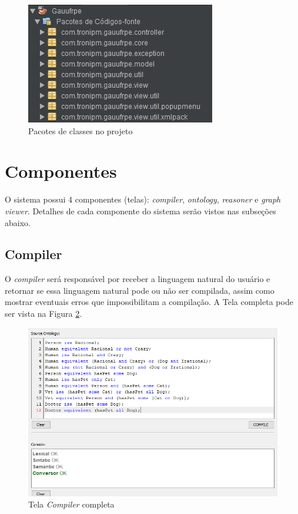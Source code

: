 \documentclass{bcc}
\begin{document}
\begin{figure}[H]
\centering
\includegraphics[width=.6\textwidth]{Figuras/estrutura.png}
\caption{Pacotes de classes no projeto}
\label{fig:pacotesJava}
\end{figure}

\section{Componentes}
O sistema possui 4 componentes (telas): \textit{compiler}, \textit{ontology}, \textit{reasoner} e \textit{graph viewer}. Detalhes de cada componente do sistema serão vistos nas subseções abaixo.

\subsection{Compiler}

O \textit{compiler} será responsável por receber a linguagem natural do usuário e retornar se essa linguagem natural pode ou não ser compilada, assim como mostrar eventuais erros que impossibilitam a compilação. A Tela completa pode ser vista na Figura \ref{fig:telaCompiler}.


\begin{figure}[H]
\centering
\includegraphics[width=.7\textwidth]{Figuras/tela_compiler.png}
\caption{Tela \textit{Compiler} completa}
\label{fig:telaCompiler}
\end{figure}
\end{document}
